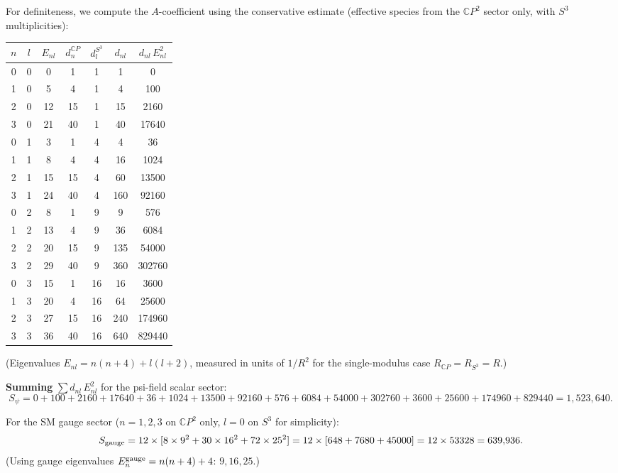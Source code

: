 \documentclass[11pt,a4paper]{article}
\newcommand{\CP}{\mathbb{C}P}
\begin{document}
For definiteness, we compute the $A$-coefficient using the
conservative estimate (effective species from the $\CP^2$ sector
only, with $S^3$ multiplicities):

\begin{center}
\small
\begin{tabular}{ccccccc}
\toprule
$n$ & $l$ & $E_{nl}$ & $d_n^{\CP}$ & $d_l^{S^3}$ & $d_{nl}$
& $d_{nl}\,E_{nl}^2$ \\
\midrule
0 & 0 & 0 & 1 & 1 & 1 & 0 \\
1 & 0 & 5 & 4 & 1 & 4 & 100 \\
2 & 0 & 12 & 15 & 1 & 15 & 2160 \\
3 & 0 & 21 & 40 & 1 & 40 & 17640 \\
0 & 1 & 3 & 1 & 4 & 4 & 36 \\
1 & 1 & 8 & 4 & 4 & 16 & 1024 \\
2 & 1 & 15 & 15 & 4 & 60 & 13500 \\
3 & 1 & 24 & 40 & 4 & 160 & 92160 \\
0 & 2 & 8 & 1 & 9 & 9 & 576 \\
1 & 2 & 13 & 4 & 9 & 36 & 6084 \\
2 & 2 & 20 & 15 & 9 & 135 & 54000 \\
3 & 2 & 29 & 40 & 9 & 360 & 302760 \\
0 & 3 & 15 & 1 & 16 & 16 & 3600 \\
1 & 3 & 20 & 4 & 16 & 64 & 25600 \\
2 & 3 & 27 & 15 & 16 & 240 & 174960 \\
3 & 3 & 36 & 40 & 16 & 640 & 829440 \\
\bottomrule
\end{tabular}
\end{center}

(Eigenvalues $E_{nl} = n(n+4) + l(l+2)$, measured in units of $1/R^2$
for the single-modulus case $R_{\CP} = R_{S^3} = R$.)

\textbf{Summing} $\sum d_{nl}\,E_{nl}^2$ for the psi-field scalar
sector:
\begin{equation}
S_{\psi} = 0 + 100 + 2160 + 17640 + 36 + 1024 + 13500 + 92160
+ 576 + 6084 + 54000 + 302760 + 3600 + 25600 + 174960 + 829440
= 1{,}523{,}640.
\label{eq:S-psi}
\end{equation}

For the SM gauge sector ($n = 1,2,3$ on $\CP^2$ only, $l = 0$ on
$S^3$ for simplicity):
\begin{equation}
S_{\rm gauge} = 12 \times [8 \times 9^2 + 30 \times 16^2 + 72 \times 25^2]
= 12 \times [648 + 7680 + 45000] = 12 \times 53328 = 639{,}936.
\end{equation}
(Using gauge eigenvalues $E_n^{\rm gauge} = n(n+4) + 4$: $9, 16, 25$.)
\end{document}
